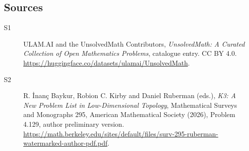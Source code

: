 \documentclass[11pt]{article}
\begin{document}
\subsection{Sources}
\begin{description}
\item[\hypertarget{source:statement:1}{S1}] ULAM.AI and the UnsolvedMath Contributors, \emph{UnsolvedMath: A Curated Collection of Open Mathematics Problems}, catalogue entry. CC BY 4.0. \url{https://huggingface.co/datasets/ulamai/UnsolvedMath}.
\item[\hypertarget{source:statement:2}{S2}] R. İnanç Baykur, Robion C. Kirby and Daniel Ruberman (eds.), \emph{K3: A New Problem List in Low-Dimensional Topology}, Mathematical Surveys and Monographs 295, American Mathematical Society (2026), Problem 4.129, author preliminary version. \url{https://math.berkeley.edu/sites/default/files/surv-295-ruberman-watermarked-author-pdf.pdf}.
\end{description}
\label{end:statement}
\end{document}
